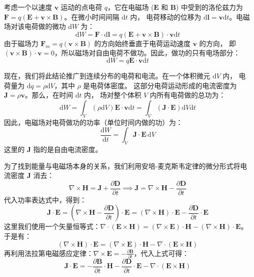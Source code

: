 \documentclass[fontset=none]{ctexart}
\begin{document}
考虑一个以速度 $\bm{v}$ 运动的点电荷 $q$，它在电磁场 ($\bm{E}$ 和 $\bm{B}$) 中受到的洛伦兹力为 
$\bm{F} = q(\bm{E} + \bm{v} \times \bm{B})$。在微小时间间隔 $\mathrm{d}t$ 内，
电荷移动的位移为 $\mathrm{d}\bm{l} = \bm{v}\mathrm{d}t$。电磁场对该电荷做的微功 $\mathrm{d}W$ 为：
\begin{equation}
    \mathrm{d}W = \bm{F} \cdot \mathrm{d}\bm{l} 
    = q(\bm{E} + \bm{v} \times \bm{B}) \cdot \bm{v}\mathrm{d}t
\end{equation}
由于磁场力 $\bm{F}_m = q(\bm{v} \times \bm{B})$ 的方向始终垂直于电荷运动速度 $\bm{v}$ 的方向，
即 $(\bm{v} \times \bm{B}) \cdot \bm{v} = 0$，所以磁场对自由电荷不做功。因此，做功的只有电场部分：
\begin{equation}
    \mathrm{d}W = q\bm{E} \cdot \bm{v}\mathrm{d}t
\end{equation}

现在，我们将此结论推广到连续分布的电荷和电流。在一个体积微元 $\mathrm{d}V$ 内，
电荷量为 $\mathrm{d}q = \rho \mathrm{d}V$，其中 $\rho$ 是电荷体密度。
这部分电荷运动形成的电流密度为 $\bm{J} = \rho \bm{v}$。那么，在时间 $\mathrm{d}t$ 内，
场对整个体积 $V$ 内所有电荷做的总功为：
\begin{equation}
    \mathrm{d}W = \int_V (\rho \mathrm{d}V) \bm{E} \cdot \bm{v} \mathrm{d}t 
    = \int_V (\bm{J} \cdot \bm{E}) \mathrm{d}V \mathrm{d}t
\end{equation}
因此，电磁场对电荷做功的功率（单位时间内做的功）为：
\begin{equation}
    \frac{\mathrm{d}W}{\mathrm{d}t} = \int_V \bm{J} \cdot \bm{E} \, \mathrm{d}V
\end{equation}
这里的 $\bm{J}$ 指的是自由电流密度。

为了找到能量与电磁场本身的关系，我们利用安培-麦克斯韦定律的微分形式将电流密度 $\bm{J}$ 消去：
\begin{equation}
    \nabla \times \bm{H} = \bm{J} + \frac{\partial \bm{D}}{\partial t} \implies \bm{J} 
    = \nabla \times \bm{H} - \frac{\partial \bm{D}}{\partial t}
\end{equation}
代入功率表达式中，得到：
\begin{equation}
    \bm{J} \cdot \bm{E} = \left(\nabla \times \bm{H} 
    - \frac{\partial \bm{D}}{\partial t}\right) \cdot \bm{E} 
    = (\nabla \times \bm{H}) \cdot \bm{E} - \frac{\partial \bm{D}}{\partial t} \cdot \bm{E}
\end{equation}
这里我们使用一个矢量恒等式：$\nabla \cdot (\bm{E} \times \bm{H}) 
= (\nabla \times \bm{E}) \cdot \bm{H} - (\nabla \times \bm{H}) \cdot \bm{E}$。于是有：
\begin{equation}
    (\nabla \times \bm{H}) \cdot \bm{E} 
    = (\nabla \times \bm{E}) \cdot \bm{H} - \nabla \cdot (\bm{E} \times \bm{H})
\end{equation}
再利用法拉第电磁感应定律：$\nabla \times \bm{E} = -\frac{\partial \bm{B}}{\partial t}$，代入上式可得：
\begin{equation}
    \bm{J} \cdot \bm{E} = -\frac{\partial \bm{B}}{\partial t} \cdot \bm{H} 
    - \frac{\partial \bm{D}}{\partial t} \cdot \bm{E} - \nabla \cdot (\bm{E} \times \bm{H})
\end{equation}
\end{document}
